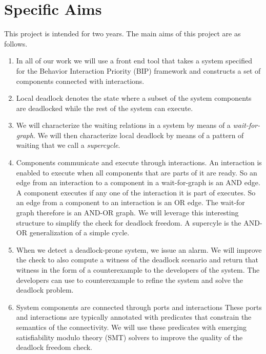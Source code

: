 \section{Specific Aims}

This project is intended for two years.
The main aims of this project are as follows.

\begin{enumerate}

\item 
In all of our work we will use a front end tool that
takes a system specified for the Behavior Interaction Priority (BIP)
framework and constructs a set of components connected 
with interactions. 

\item 
Local deadlock denotes the state where a subset of the 
system components are deadlocked while the rest of the 
system can execute. 

\item
We will characterize the waiting relations in a system by means of a
{\em wait-for-graph}. We will then characterize local deadlock by
means of a pattern of waiting that we call a \emph{supercycle}.

\item 
Components communicate and execute through interactions. 
An interaction is enabled to execute when all components that 
are parts of it are ready. 
So an edge from an interaction to a component in a wait-for-graph
is an AND edge. 
A component executes if any one of the interaction it is part of
executes. So an edge from a component to an interaction is an OR
edge. 
The wait-for graph therefore is an AND-OR graph. 
We will leverage this interesting structure to simplify the
check for deadlock freedom. 
A supercyle is the AND-OR generalization of a simple cycle.


\item 
When we detect a deadlock-prone system, we issue an alarm. 
We will improve the check to also compute a witness of the deadlock scenario 
and return that witness in the form of a counterexample 
to the developers of the system. 
The developers can use to counterexample to refine the system and solve
the deadlock problem. 

\item 
System components are connected through ports and interactions
These ports and interactions are typically annotated with predicates
that constrain the semantics of the connectivity. 
We will use these predicates with emerging satisfiability modulo theory (SMT) 
solvers to improve the quality of the deadlock freedom check.


\end{enumerate}
